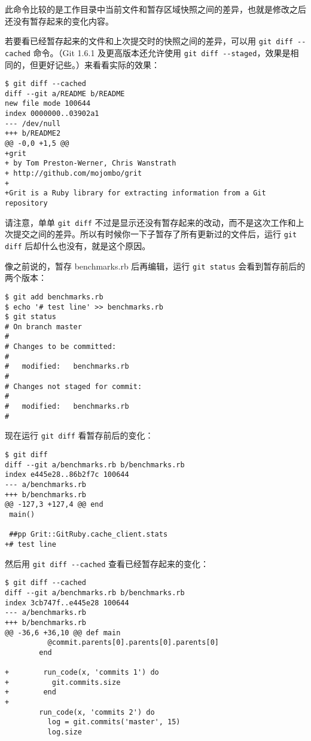 \documentclass[a4paper]{book}
\begin{document}
此命令比较的是工作目录中当前文件和暂存区域快照之间的差异，也就是修改之后还没有暂存起来的变化内容。

若要看已经暂存起来的文件和上次提交时的快照之间的差异，可以用 \texttt{git diff -{}-cached} 命令。（Git 1.6.1 及更高版本还允许使用 \texttt{git diff -{}-staged}，效果是相同的，但更好记些。）来看看实际的效果：

\begin{shaded}\begin{verbatim}
$ git diff --cached
diff --git a/README b/README
new file mode 100644
index 0000000..03902a1
--- /dev/null
+++ b/README2
@@ -0,0 +1,5 @@
+grit
+ by Tom Preston-Werner, Chris Wanstrath
+ http://github.com/mojombo/grit
+
+Grit is a Ruby library for extracting information from a Git repository
\end{verbatim}\end{shaded}

请注意，单单 \texttt{git diff} 不过是显示还没有暂存起来的改动，而不是这次工作和上次提交之间的差异。所以有时候你一下子暂存了所有更新过的文件后，运行 \texttt{git diff} 后却什么也没有，就是这个原因。

像之前说的，暂存 benchmarks.rb 后再编辑，运行 \texttt{git status} 会看到暂存前后的两个版本：

\begin{shaded}\begin{verbatim}
$ git add benchmarks.rb
$ echo '# test line' >> benchmarks.rb
$ git status
# On branch master
#
# Changes to be committed:
#
#	modified:   benchmarks.rb
#
# Changes not staged for commit:
#
#	modified:   benchmarks.rb
#
\end{verbatim}\end{shaded}

现在运行 \texttt{git diff} 看暂存前后的变化：

\begin{shaded}\begin{verbatim}
$ git diff
diff --git a/benchmarks.rb b/benchmarks.rb
index e445e28..86b2f7c 100644
--- a/benchmarks.rb
+++ b/benchmarks.rb
@@ -127,3 +127,4 @@ end
 main()
 
 ##pp Grit::GitRuby.cache_client.stats
+# test line
\end{verbatim}\end{shaded}

然后用 \texttt{git diff -{}-cached} 查看已经暂存起来的变化：

\begin{shaded}\begin{verbatim}
$ git diff --cached
diff --git a/benchmarks.rb b/benchmarks.rb
index 3cb747f..e445e28 100644
--- a/benchmarks.rb
+++ b/benchmarks.rb
@@ -36,6 +36,10 @@ def main
          @commit.parents[0].parents[0].parents[0]
        end

+        run_code(x, 'commits 1') do
+          git.commits.size
+        end
+
        run_code(x, 'commits 2') do
          log = git.commits('master', 15)
          log.size
\end{verbatim}\end{shaded}
\end{document}
